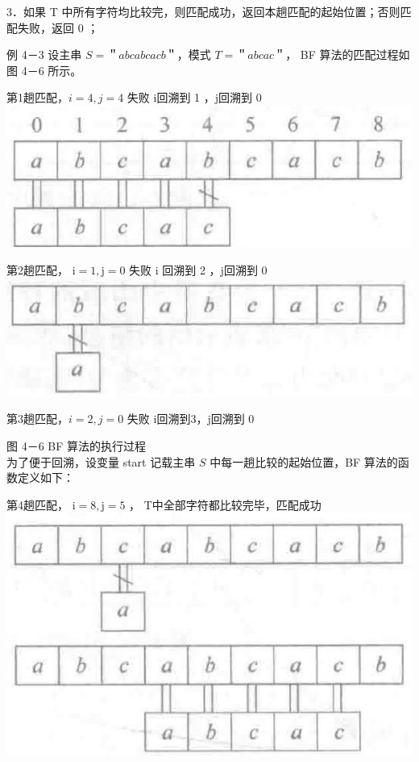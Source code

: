 \documentclass[10pt]{article}
\begin{document}
3．如果 T 中所有字符均比较完，则匹配成功，返回本趟匹配的起始位置；否则匹配失败，返回 0 ；

例 4－3 设主串 $S=$＂$a b c a b c a c b$＂，模式 $T=$＂$a b c a c$＂， BF 算法的匹配过程如图 4－6 所示。

第1趟匹配，$i=4, j=4$ 失败 i回溯到 1 ，j回溯到 0\\
\includegraphics[max width=\textwidth, center]{2025_06_06_704745ea57b15b2333e5g-117}

第2趟匹配， $\mathrm{i}=1, \mathrm{j}=0$ 失败 i 回溯到 2 ，j回溯到 0\\
\includegraphics[max width=\textwidth, center]{2025_06_06_704745ea57b15b2333e5g-117(1)}

第3趟匹配，$i=2, j=0$ 失败 i回溯到3，j回溯到 0

图 4－6 BF 算法的执行过程\\
为了便于回溯，设变量 start 记载主串 $S$ 中每一趟比较的起始位置，BF 算法的函数定义如下：

第4趟匹配， $\mathrm{i}=8, \mathrm{j}=5$ ， T中全部字符都比较完毕，匹配成功\\
\includegraphics[max width=\textwidth, center]{2025_06_06_704745ea57b15b2333e5g-117(2)}
\end{document}
